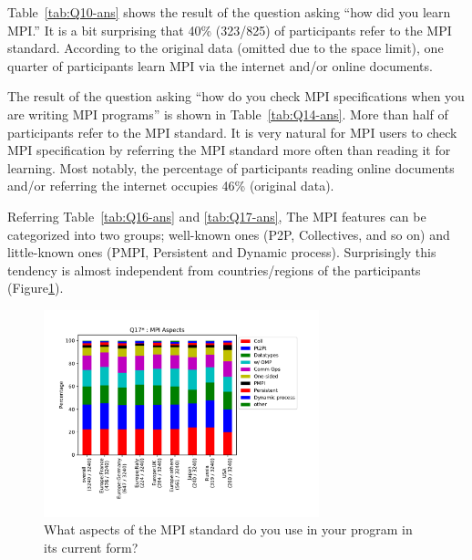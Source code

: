 \documentclass[sigconf,nonacm]{acmart}
\begin{document}
Table~\ref{tab:Q10-ans} shows the result of the question asking ``how
did you learn MPI.'' It is a bit surprising that 40\% (323/825) of
participants refer to the MPI standard. According to the original
data (omitted due to the space limit), one quarter of participants
learn MPI via the internet and/or online documents. 

The result of the question asking ``how do you check MPI
specifications when you are writing MPI programs'' is shown in
Table~\ref{tab:Q14-ans}. More than half of participants refer to the
MPI standard. It is very natural for MPI users to check MPI
specification by referring the MPI standard more often than reading it
for learning. Most notably, the percentage of participants reading
online documents and/or referring the internet occupies 46\% (original
data). 

Referring Table~\ref{tab:Q16-ans} and \ref{tab:Q17-ans}, The MPI
features can be categorized into two groups; well-known ones (P2P,
Collectives, and so on) and little-known ones (PMPI, Persistent and
Dynamic process). Surprisingly this tendency is almost independent
from countries/regions of the participants (Figure\ref{fig:Q17}). 


\begin{figure}[htb]
\begin{center}
\includegraphics[width=8cm]{figs/Q17.pdf}
\vspace{-8mm}
\caption{What aspects of the MPI standard do you use in your program in its current form?}%
\label{fig:Q17}
\end{center}
\end{figure}
\end{document}
